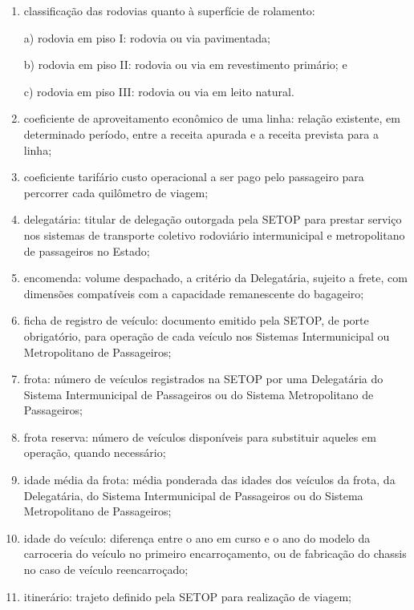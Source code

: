 \begin{enumerate}[resume,label=Art. \arabic*]
\begin{enumerate}[label=\roman*.]
\item classificação das rodovias quanto à superfície de rolamento:

a) rodovia em piso I: rodovia ou via pavimentada;

b) rodovia em piso II: rodovia ou via em revestimento primário; e

c) rodovia em piso III: rodovia ou via em leito natural.

\item coeficiente de aproveitamento econômico de uma linha: relação existente, em determinado período, entre a receita apurada e a receita prevista para a linha;

\item coeficiente tarifário custo operacional a ser pago pelo passageiro para percorrer cada quilômetro de viagem;

\item delegatária: titular de delegação outorgada pela SETOP para prestar serviço nos sistemas de transporte coletivo rodoviário intermunicipal e metropolitano de passageiros no Estado;

\item encomenda: volume despachado, a critério da Delegatária, sujeito a frete, com dimensões compatíveis com a capacidade remanescente do bagageiro;

\item ficha de registro de veículo: documento emitido pela SETOP, de porte obrigatório, para operação de cada veículo nos Sistemas Intermunicipal ou Metropolitano de Passageiros;

\item frota: número de veículos registrados na SETOP por uma Delegatária do Sistema Intermunicipal de Passageiros ou do Sistema Metropolitano de Passageiros;

\item frota reserva: número de veículos disponíveis para substituir aqueles em operação, quando necessário;

\item idade média da frota: média ponderada das idades dos veículos da frota, da Delegatária, do Sistema Intermunicipal de Passageiros ou do Sistema Metropolitano de Passageiros;

\item idade do veículo: diferença entre o ano em curso e o ano do modelo da carroceria do veículo no primeiro encarroçamento, ou de fabricação do chassis no caso de veículo reencarroçado;

\item itinerário: trajeto definido pela SETOP para realização de viagem;


\end{enumerate}
\end{enumerate}
